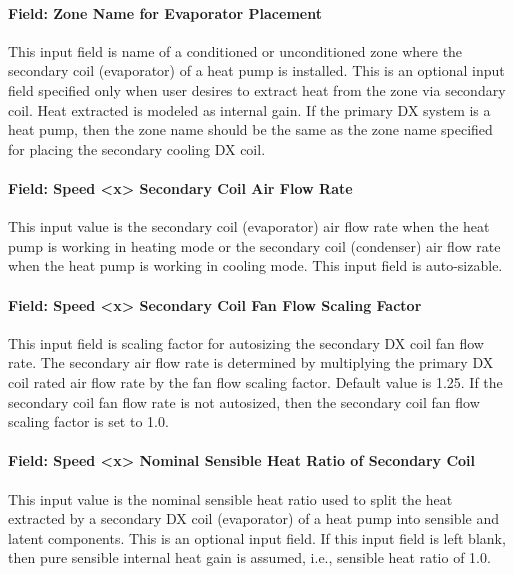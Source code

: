 \paragraph{Field: Zone Name for Evaporator Placement}\label{field-zone-name-for-evaporator-placement-1}

This input field is name of a conditioned or unconditioned zone where the secondary coil (evaporator) of a heat pump is installed. This is an optional input field specified only when user desires to extract heat from the zone via secondary coil. Heat extracted is modeled as internal gain. If the primary DX system is a heat pump, then the zone name should be the same as the zone name specified for placing the secondary cooling DX coil.

\paragraph{Field: Speed \textless{}x\textgreater{} Secondary Coil Air Flow Rate}\label{field-speed-x-secondary-coil-air-flow-rate}

This input value is the secondary coil (evaporator) air flow rate when the heat pump is working in heating mode or the secondary coil (condenser) air flow rate when the heat pump is working in cooling mode. This input field is auto-sizable.

\paragraph{Field: Speed \textless{}x\textgreater{} Secondary Coil Fan Flow Scaling Factor}\label{field-speed-x-secondary-coil-fan-flow-scaling-factor}

This input field is scaling factor for autosizing the secondary DX coil fan flow rate. The secondary air flow rate is determined by multiplying the primary DX coil rated air flow rate by the fan flow scaling factor. Default value is 1.25. If the secondary coil fan flow rate is not autosized, then the secondary coil fan flow scaling factor is set to 1.0.

\paragraph{Field: Speed \textless{}x\textgreater{} Nominal Sensible Heat Ratio of Secondary Coil}\label{field-speed-x-nominal-sensible-heat-ratio-of-secondary-coil}

This input value is the nominal sensible heat ratio used to split the heat extracted by a secondary DX coil (evaporator) of a heat pump into sensible and latent components. This is an optional input field. If this input field is left blank, then pure sensible internal heat gain is assumed, i.e., sensible heat ratio of 1.0.

